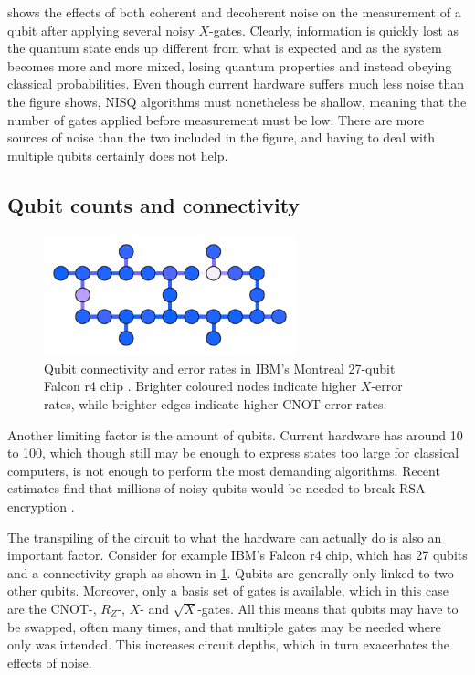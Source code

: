  shows the effects of both coherent and decoherent noise on the measurement of a qubit after applying several noisy $X$-gates.
Clearly, information is quickly lost as the quantum state ends up different from what is expected and as the system becomes more and more mixed, losing quantum properties and instead obeying classical probabilities.
Even though current hardware suffers much less noise than the figure shows, NISQ algorithms must nonetheless be shallow, meaning that the number of gates applied before measurement must be low.
There are more sources of noise than the two included in the figure, and having to deal with multiple qubits certainly does not help.

\subsection{Qubit counts and connectivity}
\label{sec:qubit_counts}
\begin{figure}
    \centering
    \includegraphics[width=0.65\textwidth]{connectivity.pdf}
    \caption{
        Qubit connectivity and error rates in IBM's Montreal 27-qubit Falcon r4 chip \autocite{connectivity}.
        Brighter coloured nodes indicate higher $X$-error rates, while brighter edges indicate higher CNOT-error rates.
    }
    \label{fig:connectivity}
\end{figure}

Another limiting factor is the amount of qubits.
Current hardware has around 10 to 100, which though still may be enough to express states too large for classical computers, is not enough to perform the most demanding algorithms.
Recent estimates find that millions of noisy qubits would be needed to break RSA encryption \autocite{gidney2021}.

The transpiling of the circuit to what the hardware can actually do is also an important factor.
Consider for example IBM's Falcon r4 chip, which has 27 qubits and a connectivity graph as shown in \cref{fig:connectivity}.
Qubits are generally only linked to two other qubits.
Moreover, only a basis set of gates is available, which in this case are the CNOT-, $R_Z$-, $X$- and $\sqrt{X}$-gates.
All this means that qubits may have to be swapped, often many times, and that multiple gates may be needed where only was intended.
This increases circuit depths, which in turn exacerbates the effects of noise.